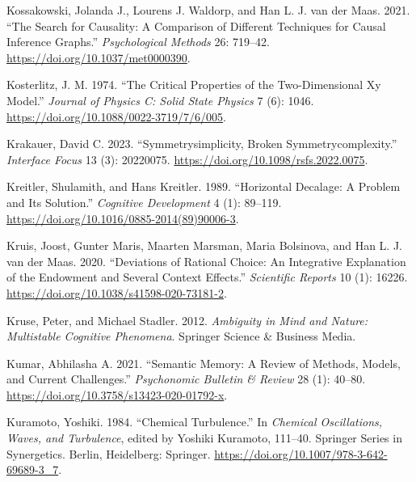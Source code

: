\documentclass[
  a4paper,
  DIV=11,
  numbers=noendperiod,
  oneside]{scrreprt}
\newlength{\cslhangindent}
\newlength{\cslentryspacingunit} %
\newenvironment{CSLReferences}[2] %
 {%
  \setlength{\parindent}{0pt}
  \ifodd #1
  \let\oldpar\par
  \def\par{\hangindent=\cslhangindent\oldpar}
  \fi
  \setlength{\parskip}{#2\cslentryspacingunit}
 }%
 {}
\begin{document}
\begin{CSLReferences}{1}{0}
\leavevmode{}%
Kossakowski, Jolanda J., Lourens J. Waldorp, and Han L. J. van der Maas.
2021. {``The Search for Causality: {A} Comparison of Different
Techniques for Causal Inference Graphs.''} \emph{Psychological Methods}
26: 719--42. \url{https://doi.org/10.1037/met0000390}.

\leavevmode{}%
Kosterlitz, J. M. 1974. {``The Critical Properties of the
Two-Dimensional Xy Model.''} \emph{Journal of Physics C: Solid State
Physics} 7 (6): 1046. \url{https://doi.org/10.1088/0022-3719/7/6/005}.

\leavevmode{}%
Krakauer, David C. 2023. {``Symmetry\textendash simplicity, Broken
Symmetry\textendash complexity.''} \emph{Interface Focus} 13 (3):
20220075. \url{https://doi.org/10.1098/rsfs.2022.0075}.

\leavevmode{}%
Kreitler, Shulamith, and Hans Kreitler. 1989. {``Horizontal Decalage:
{A} Problem and Its Solution.''} \emph{Cognitive Development} 4 (1):
89--119. \url{https://doi.org/10.1016/0885-2014(89)90006-3}.

\leavevmode{}%
Kruis, Joost, Gunter Maris, Maarten Marsman, Maria Bolsinova, and Han L.
J. van der Maas. 2020. {``Deviations of Rational Choice: An Integrative
Explanation of the Endowment and Several Context Effects.''}
\emph{Scientific Reports} 10 (1): 16226.
\url{https://doi.org/10.1038/s41598-020-73181-2}.

\leavevmode{}%
Kruse, Peter, and Michael Stadler. 2012. \emph{Ambiguity in {Mind} and
{Nature}: {Multistable Cognitive Phenomena}}. {Springer Science \&
Business Media}.

\leavevmode{}%
Kumar, Abhilasha A. 2021. {``Semantic Memory: {A} Review of Methods,
Models, and Current Challenges.''} \emph{Psychonomic Bulletin \& Review}
28 (1): 40--80. \url{https://doi.org/10.3758/s13423-020-01792-x}.

\leavevmode{}%
Kuramoto, Yoshiki. 1984. {``Chemical {Turbulence}.''} In \emph{Chemical
{Oscillations}, {Waves}, and {Turbulence}}, edited by Yoshiki Kuramoto,
111--40. Springer {Series} in {Synergetics}. {Berlin, Heidelberg}:
{Springer}. \url{https://doi.org/10.1007/978-3-642-69689-3_7}.


\end{CSLReferences}
\end{document}
